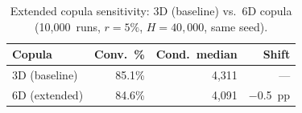 \begin{table}[htbp]
\centering
\caption{Extended copula sensitivity: 3D (baseline) vs.\ 6D copula (10{,}000~runs, $r = 5\%$, $H = 40{,}000$, same seed).}
\label{tab:copula_6d}
\small
\begin{tabular}{@{}lrrr@{}}
\toprule
Copula & Conv.\ \% & Cond.\ median & Shift \\
\midrule
3D (baseline) & 85.1\% & 4{,}311 & --- \\
6D (extended) & 84.6\% & 4{,}091 & $-$0.5~pp \\
\bottomrule
\end{tabular}
\end{table}
